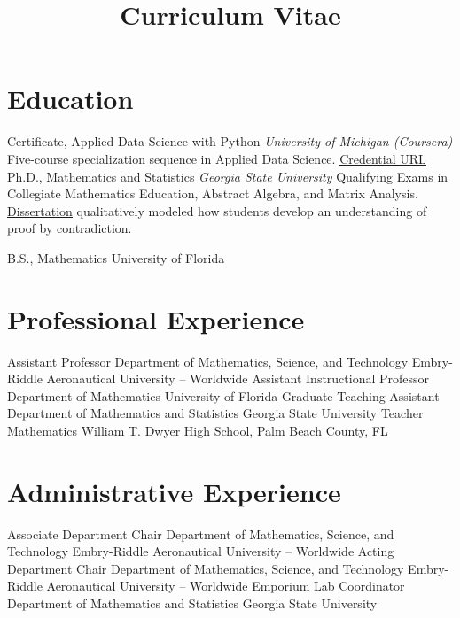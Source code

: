 \documentclass[10pt,a4paper,sans]{moderncv}
\title{Curriculum Vitae}
\begin{document}
	\makecvtitle
	\vspace*{-1cm}
	
	\section{Education}
	{Certificate, Applied Data Science with Python}
	{}{}
	{\textit{University of Michigan (Coursera)}}
	{ Five-course specialization sequence in Applied Data Science. 
		\href{https://www.coursera.org/account/accomplishments/specialization/certificate/7TEVNZ89JDDA}{\underline{Credential URL}}  
	}
	{}
	{Ph.D., Mathematics and Statistics}
	{}{}
	{\textit{Georgia State University}}
	{Qualifying Exams in Collegiate Mathematics Education, Abstract Algebra, and Matrix Analysis. \\ 
		\href{https://doi.org/10.57709/10460722}{\underline{Dissertation}} qualitatively modeled how students develop an understanding of proof by contradiction. 
	}
	{}
	
	{B.S., Mathematics}
	{University of Florida}
	{}{}{}
	\section{Professional Experience}
	{Assistant Professor}
	{}
	{Department of Mathematics, Science, and Technology}
	{Embry-Riddle Aeronautical University -- Worldwide}
	{}
	{Assistant Instructional Professor}
	{}
	{Department of Mathematics}
	{University of Florida}
	{}
	{Graduate Teaching Assistant}
	{}
	{Department of Mathematics and Statistics}
	{Georgia State University}
	{}
	{Teacher}
	{}
	{Mathematics}
	{William T. Dwyer High School, Palm Beach County, FL}
	{} 
	\section{Administrative Experience}
	{Associate Department Chair}
	{}
	{Department of Mathematics, Science, and Technology}
	{Embry-Riddle Aeronautical University -- Worldwide}
	{}
	{Acting Department Chair}
	{}
	{Department of Mathematics, Science, and Technology}
	{Embry-Riddle Aeronautical University -- Worldwide}
	{}
	{Emporium Lab Coordinator}
	{}
	{Department of Mathematics and Statistics}
	{Georgia State University}
	{}
\end{document}
